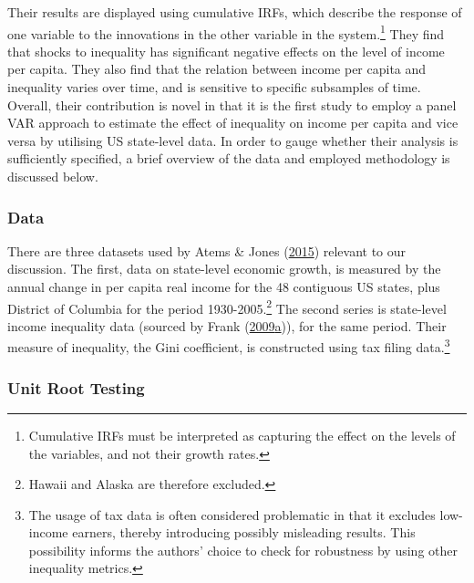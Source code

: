 \documentclass[11pt,preprint, authoryear]{elsarticle}
\numberwithin{equation}{section}
\numberwithin{figure}{section}
\numberwithin{table}{section}
\let\rmarkdownfootnote\footnote%
\def\footnote{\protect\rmarkdownfootnote}
\begin{document}
Their results are displayed using cumulative IRFs, which describe the
response of one variable to the innovations in the other variable in the
system.\footnote{Cumulative IRFs must be interpreted as capturing the
  effect on the levels of the variables, and not their growth rates.}
They find that shocks to inequality has significant negative effects on
the level of income per capita. They also find that the relation between
income per capita and inequality varies over time, and is sensitive to
specific subsamples of time. Overall, their contribution is novel in
that it is the first study to employ a panel VAR approach to estimate
the effect of inequality on income per capita and vice versa by
utilising US state-level data. In order to gauge whether their analysis
is sufficiently specified, a brief overview of the data and employed
methodology is discussed below.

\hypertarget{data}{%
\subsubsection*{Data}\label{data}}

There are three datasets used by Atems \& Jones
(\protect\hyperlink{ref-atems}{2015}) relevant to our discussion. The
first, data on state-level economic growth, is measured by the annual
change in per capita real income for the 48 contiguous US states, plus
District of Columbia for the period 1930-2005.\footnote{Hawaii and
  Alaska are therefore excluded.} The second series is state-level
income inequality data (sourced by Frank
(\protect\hyperlink{ref-frank}{2009}\protect\hyperlink{ref-frank}{a})),
for the same period. Their measure of inequality, the Gini coefficient,
is constructed using tax filing data.\footnote{The usage of tax data is
  often considered problematic in that it excludes low-income earners,
  thereby introducing possibly misleading results. This possibility
  informs the authors' choice to check for robustness by using other
  inequality metrics.}

\hypertarget{unit-root-testing}{%
\subsubsection*{Unit Root Testing}\label{unit-root-testing}}
\end{document}
